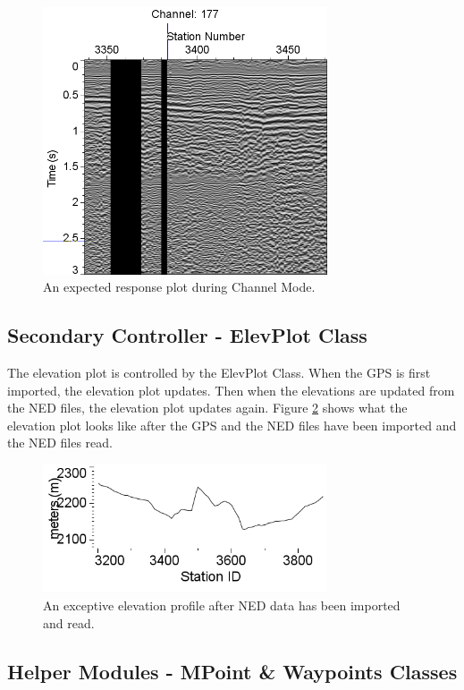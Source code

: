 \documentclass[12pt]{article}
\begin{document}
\begin{figure}[H]
\centering
\includegraphics[width=0.75\textwidth]{./figs/fig5.png}
\caption{An expected response plot during Channel Mode.}
\label{FIG:RPC}
\end{figure}

\subsection{Secondary Controller - ElevPlot Class}

The elevation plot is controlled by the ElevPlot Class. When the GPS is first imported, the elevation plot updates. Then when the elevations are updated from the NED files, the elevation plot updates again. Figure \ref{FIG:EP} shows what the elevation plot looks like after the GPS and the NED files have been imported and the NED files read.

\begin{figure}[H]
\centering
\includegraphics[width=0.75\textwidth]{figs/fig2.png}
\caption{An exceptive elevation profile after NED data has been imported and read.}
\label{FIG:EP}
\end{figure}

\subsection{Helper Modules - MPoint \& Waypoints Classes}
\end{document}
